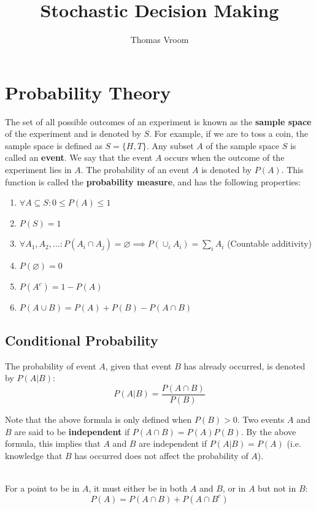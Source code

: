\documentclass[12pt]{article}
\title{Stochastic Decision Making}
\author{Thomas Vroom}
\begin{document}
\maketitle

%
%
\section{Probability Theory}
The set of all possible outcomes of an experiment is known as the \textbf{sample space} of the experiment and is denoted by $S$.
For example, if we are to toss a coin, the sample space is defined as $S = \{H, T\}$.
Any subset $A$ of the sample space $S$ is called an \textbf{event}.
We say that the event $A$ occurs when the outcome of the experiment lies in $A$.
The probability of an event $A$ is denoted by $P(A)$.
This function is called the \textbf{probability measure}, and has the following properties:

\begin{enumerate}
    \item $\forall A \subseteq S : 0 \leq P(A) \leq 1$
    \item $P(S) = 1$
    \item $\forall A_1, A_2, ... : P(A_i \cap A_j) = \varnothing \implies P(\cup_i A_i) = \sum_i A_i$ \hfill (Countable additivity)
    \item $P(\varnothing) = 0$
    \item $P(A^c) = 1 - P(A)$ 
    \item $P(A \cup B) = P(A) + P(B) - P(A \cap B)$
\end{enumerate}

\subsection{Conditional Probability}
The probability of event $A$, given that event $B$ has already occurred, is denoted by $P(A|B)$:
\[ P(A|B) = \frac{P(A \cap B)}{P(B)} \]

\noindent
Note that the above formula is only defined when $P(B) > 0$.
Two events $A$ and $B$ are said to be \textbf{independent} if $P(A \cap B) = P(A)P(B)$.
By the above formula, this implies that $A$ and $B$ are independent if $P(A|B) = P(A)$ (i.e. knowledge that $B$ has occurred does not affect the probability of $A$).

\noindent
\\
For a point to be in $A$, it must either be in both $A$ and $B$, or in $A$ but not in $B$:
\[ P(A) = P(A \cap B) + P(A \cap B^c) \]
\end{document}
